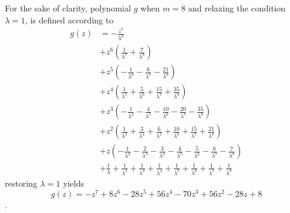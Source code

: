 For the sake of clarity, polynomial $g$ when $m=8$ and relaxing the condition $\lambda=1$, is defined according to 
\begin{displaymath}
\begin{split}
g{\left (z \right )} &= - \frac{z^{7}}{\lambda^{8}} \\
&+ z^{6} \left(\frac{1}{\lambda^{7}} + \frac{7}{\lambda^{8}}\right) \\
&+ z^{5} \left(- \frac{1}{\lambda^{6}} - \frac{6}{\lambda^{7}} - \frac{21}{\lambda^{8}}\right) \\
&+ z^{4} \left(\frac{1}{\lambda^{5}} + \frac{5}{\lambda^{6}} + \frac{15}{\lambda^{7}} + \frac{35}{\lambda^{8}}\right) \\
&+ z^{3} \left(- \frac{1}{\lambda^{4}} - \frac{4}{\lambda^{5}} - \frac{10}{\lambda^{6}} - \frac{20}{\lambda^{7}} - \frac{35}{\lambda^{8}}\right) \\
&+ z^{2} \left(\frac{1}{\lambda^{3}} + \frac{3}{\lambda^{4}} + \frac{6}{\lambda^{5}} + \frac{10}{\lambda^{6}} + \frac{15}{\lambda^{7}} + \frac{21}{\lambda^{8}}\right) \\
&+ z \left(- \frac{1}{\lambda^{2}} - \frac{2}{\lambda^{3}} - \frac{3}{\lambda^{4}} - \frac{4}{\lambda^{5}} - \frac{5}{\lambda^{6}} - \frac{6}{\lambda^{7}} - \frac{7}{\lambda^{8}}\right) \\
&+ \frac{1}{\lambda} + \frac{1}{\lambda^{2}} + \frac{1}{\lambda^{3}} + \frac{1}{\lambda^{4}} + \frac{1}{\lambda^{5}} + \frac{1}{\lambda^{6}} + \frac{1}{\lambda^{7}} + \frac{1}{\lambda^{8}}
\end{split}
\end{displaymath}
restoring $\lambda=1$ yields \[g{\left (z \right )} = - z^{7} + 8 z^{6} - 28 z^{5} + 56 z^{4} - 70 z^{3} + 56 z^{2} - 28 z + 8\].

